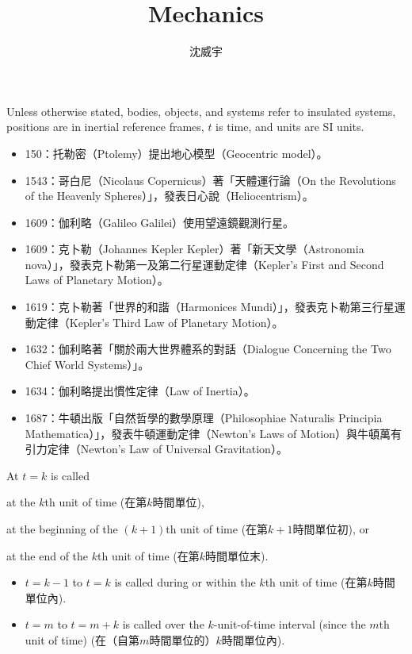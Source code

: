 \documentclass[a4paper,12pt]{article}
\begin{document}
\title{Mechanics}
\author{沈威宇}
\date{\temtoday}
\titletocdoc
{}
Unless otherwise stated, bodies, objects, and systems refer to insulated systems, positions are in inertial reference frames, $t$ is time, and units are SI units.
\begin{itemize}
\item 150：托勒密（Ptolemy）提出地心模型（Geocentric model）。
\item 1543：哥白尼（Nicolaus Copernicus）著「天體運行論（On the Revolutions of the Heavenly Spheres）」，發表日心說（Heliocentrism）。
\item 1609：伽利略（Galileo Galilei）使用望遠鏡觀測行星。
\item 1609：克卜勒（Johannes Kepler Kepler）著「新天文學（Astronomia nova）」，發表克卜勒第一及第二行星運動定律（Kepler's First and Second Laws of Planetary Motion）。
\item 1619：克卜勒著「世界的和諧（Harmonices Mundi）」，發表克卜勒第三行星運動定律（Kepler's Third Law of Planetary Motion）。
\item 1632：伽利略著「關於兩大世界體系的對話（Dialogue Concerning the Two Chief World Systems）」。
\item 1634：伽利略提出慣性定律（Law of Inertia）。
\item 1687：牛頓出版「自然哲學的數學原理（Philosophiae Naturalis Principia Mathematica）」，發表牛頓運動定律（Newton's Laws of Motion）與牛頓萬有引力定律（Newton's Law of Universal Gravitation）。
\end{itemize}
At $t=k$ is called
\bit
\item at the $k$th unit of time (在第$k$時間單位),
\item at the beginning of the $(k+1)$th unit of time (在第$k+1$時間單位初), or
\item at the end of the $k$th unit of time (在第$k$時間單位末).
\eit
{}
\begin{itemize}
\item $t=k-1$ to $t=k$ is called during or within the $k$th unit of time (在第$k$時間單位內).
\item $t=m$ to $t=m+k$ is called over the $k$-unit-of-time interval (since the $m$th unit of time) (在（自第$m$時間單位的）$k$時間單位內).
\end{itemize}
\end{document}
